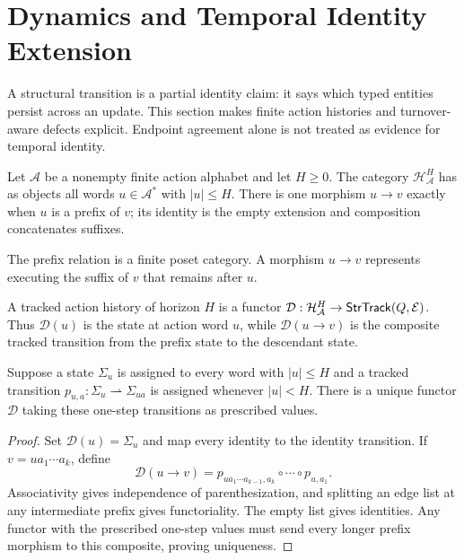 \section{Dynamics and Temporal Identity Extension}

A structural transition is a partial identity claim: it says which typed
entities persist across an update. This section makes finite action histories
and turnover-aware defects explicit. Endpoint agreement alone is not treated
as evidence for temporal identity.

\begin{definition}
Let $\mathcal A$ be a nonempty finite action alphabet and let $H\geq0$. The
category $\mathcal H_{\mathcal A}^H$ has as objects all words
$u\in\mathcal A^*$ with $|u|\leq H$. There is one morphism $u\to v$ exactly
when $u$ is a prefix of $v$; its identity is the empty extension and composition
concatenates suffixes.
\end{definition}

The prefix relation is a finite poset category. A morphism $u\to v$ represents
executing the suffix of $v$ that remains after $u$.

\begin{definition}
A tracked action history of horizon $H$ is a functor
$\mathcal D:\mathcal H_{\mathcal A}^H\to\mathsf{StrTrack}(Q,\mathcal E)$.
Thus $\mathcal D(u)$ is the state at action word $u$, while
$\mathcal D(u\to v)$ is the composite tracked transition from the prefix state
to the descendant state.
\end{definition}

\begin{theorem}
Suppose a state $\Sigma_u$ is assigned to every word with $|u|\leq H$ and a
tracked transition $p_{u,a}:\Sigma_u\rightharpoonup\Sigma_{ua}$ is assigned
whenever $|u|<H$. There is a unique functor $\mathcal D$ taking these one-step
transitions as prescribed values.
\end{theorem}

\begin{proof}
Set $\mathcal D(u)=\Sigma_u$ and map every identity to the identity transition.
If $v=ua_1\cdots a_k$, define
\[
\mathcal D(u\to v)=
p_{ua_1\cdots a_{k-1},a_k}\circ\cdots\circ p_{u,a_1}.
\]
Associativity gives independence of parenthesization, and splitting an edge list
at any intermediate prefix gives functoriality. The empty list gives identities.
Any functor with the prescribed one-step values must send every longer prefix
morphism to this composite, proving uniqueness.
\end{proof}

